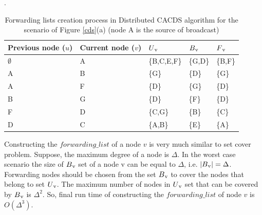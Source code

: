 \begin{table}[h]

  \begin{center}
    \caption{Forwarding lists creation process in Distributed CACDS algorithm for the scenario of Figure \ref{cds}(a) (node A is the source of broadcast)}.
     \medskip
    \label{table:5}
    \renewcommand{\arraystretch}{1}
       \begin{tabular} {|>{\centering\arraybackslash}p{1cm}|>{\centering\arraybackslash}p{1cm} |>{\centering\arraybackslash}p{1.5cm} | >{\centering\arraybackslash}p{2cm}|>{\centering\arraybackslash}p{1cm}|}
      \hline
      \bf{Previous node ($u$)} & \bf{Current node ($v$)} & \bf{$U\textsubscript{v}$} & \bf{$B\textsubscript{v}$} & \bf{$F\textsubscript{v}$} \\
      \hline
      $\emptyset$ & A &\{B,C,E,F\} &\{G,D\} &\{B,F\} \\
      \hline
      A  & B  & \{G\}& \{D\} & \{G\}  \\
      \hline
      A  & F  & \{D\} & \{G\} & \{D\}  \\
      \hline
      B  & G & \{D\} & \{F\} & \{D\} \\
      \hline
      F  & D &\{C,G\}& \{B\} & \{C\}    \\
      \hline
      D  & C & \{A,B\} & \{E\}& \{A\}   \\
      \hline
    
    \end{tabular}

  \end{center}
\end{table}

Constructing the $forwarding\_list$ of a node $v$ is very much similar to set cover problem.  Suppose, the maximum degree of a node is $\Delta$. In the worst case scenario the size of $B\textsubscript{v}$ set of a node v can be equal to $\Delta$, i.e. $|B\textsubscript{v}| = \Delta$. Forwarding nodes should be chosen from the set $B\textsubscript{v}$ to cover the nodes that belong to set $U\textsubscript{v}$. The maximum number of nodes in $U\textsubscript{v}$ set that can be covered by $B\textsubscript{v}$ is $\Delta^2$. So, final run time of constructing the $forwarding\_list$ of node $v$ is $O(\Delta^3)$.

